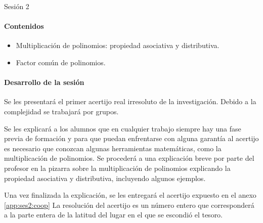 



\newcommand{\numpreg}


\section{Sesión 2}



\paragraph{Contenidos}
\begin{itemize}
	\item Multiplicación de polinomios: propiedad asociativa y distributiva.
	\item Factor común de polinomios.
\end{itemize}

\paragraph{Desarrollo de la sesión}

Se les presentará el primer acertijo real irresoluto de la investigación.
%
Debido a la complejidad se trabajará por grupos.

Se les explicará a los alumnos que en cualquier trabajo siempre hay una fase previa de formación y para que puedan enfrentarse con alguna garantía al acertijo es necesario que conozcan algunas herramientas matemáticas, como la multiplicación de polinomios.
%
Se procederá a una explicación breve por parte del profesor en la pizarra sobre la multiplicación de polinomios explicando la propiedad asociativa y distributiva, incluyendo algunos ejemplos.

Una vez finalizada la explicación, se les entregará el acertijo expuesto en el anexo \ref{app:ses2:coop}
%
La resolución del acertijo es un número entero que corresponderá a la parte entera de la latitud del lugar en el que se escondió el tesoro.



